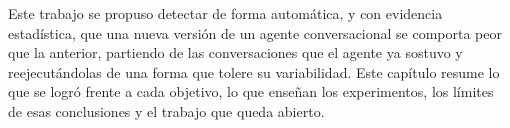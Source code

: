 \clearpage
\blank
{}
\begingroup\dobleesp
\vspace{6pt}
Este trabajo se propuso detectar de forma automática, y con evidencia estadística, que una nueva versión de un agente conversacional se comporta peor que la anterior, partiendo de las conversaciones que el agente ya sostuvo y reejecutándolas de una forma que tolere su variabilidad. Este capítulo resume lo que se logró frente a cada objetivo, lo que enseñan los experimentos, los límites de esas conclusiones y el trabajo que queda abierto.
\par

